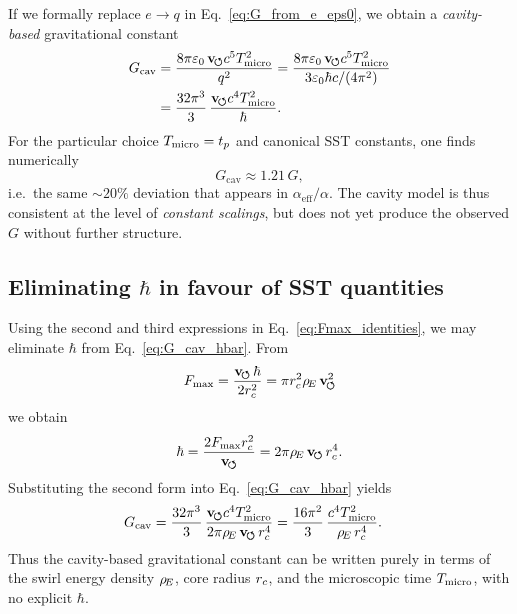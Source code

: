 \documentclass[11pt]{article}
\begin{document}
            If we formally replace $e\to q$ in
            Eq.~\eqref{eq:G_from_e_eps0}, we obtain a
            \emph{cavity-based} gravitational constant
            \begin{align}
                G_{\mathrm{cav}}
                &= \frac{8\pi \varepsilon_0\,\mathbf{v}_{\!\boldsymbol{\circlearrowleft}} c^5 T_{\rm micro}^2}{q^2}
                = \frac{8\pi \varepsilon_0\,\mathbf{v}_{\!\boldsymbol{\circlearrowleft}} c^5 T_{\rm micro}^2}
                {3\varepsilon_0\hbar c/(4\pi^2)} \\
                &= \frac{32\pi^3}{3}\,
                \frac{\mathbf{v}_{\!\boldsymbol{\circlearrowleft}} c^4 T_{\rm micro}^2}{\hbar}.
                \label{eq:G_cav_hbar}
            \end{align}
            For the particular choice $T_{\rm micro}=t_p$ and canonical SST
            constants, one finds numerically
            \begin{equation}
                G_{\mathrm{cav}} \approx 1.21\,G,
            \end{equation}
            i.e.\ the same $\sim 20\%$ deviation that appears in
            $\alpha_{\mathrm{eff}}/\alpha$.  The cavity model is thus consistent at
            the level of \emph{constant scalings}, but does not yet produce the
            observed $G$ without further structure.

        \subsection{Eliminating \texorpdfstring{$\hbar$}{ħ} in favour of SST quantities}

            Using the second and third expressions in
            Eq.~\eqref{eq:Fmax_identities}, we may eliminate $\hbar$ from
            Eq.~\eqref{eq:G_cav_hbar}.  From
            \begin{equation}
                F_{\max}
                = \frac{\mathbf{v}_{\!\boldsymbol{\circlearrowleft}}\,\hbar}{2r_c^2}
                = \pi r_c^2 \rho_{\!E}\,\mathbf{v}_{\!\boldsymbol{\circlearrowleft}}^2
            \end{equation}
            we obtain
            \begin{equation}
                \hbar
                = \frac{2 F_{\max}r_c^2}{\mathbf{v}_{\!\boldsymbol{\circlearrowleft}}}
                = 2\pi\rho_{\!E}\,\mathbf{v}_{\!\boldsymbol{\circlearrowleft}}\,r_c^4.
                \label{eq:hbar_from_SST}
            \end{equation}
            Substituting the second form into Eq.~\eqref{eq:G_cav_hbar} yields
            \begin{align}
                G_{\mathrm{cav}}
                &= \frac{32\pi^3}{3}\,
                \frac{\mathbf{v}_{\!\boldsymbol{\circlearrowleft}} c^4 T_{\rm micro}^2}{2\pi\rho_{\!E}\,\mathbf{v}_{\!\boldsymbol{\circlearrowleft}}\,r_c^4}
                = \frac{16\pi^2}{3}\,
                \frac{c^4 T_{\rm micro}^2}{\rho_{\!E}\,r_c^4}.
                \label{eq:G_cav_rhoE}
            \end{align}
            Thus the cavity-based gravitational constant can be written purely in
            terms of the swirl energy density $\rho_{\!E}$, core radius $r_c$, and the
            microscopic time $T_{\rm micro}$, with no explicit $\hbar$.
\end{document}
